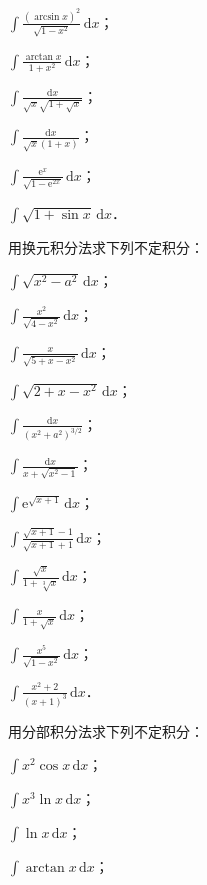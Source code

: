 \begin{xiti}
\begin{ziti}
\item $\displaystyle\int\frac{(\arcsin x)^{2}}{\sqrt{1-x^{2}}}\,\mathrm{d}x$；
\item $\displaystyle\int\frac{\arctan x}{1+x^{2}}\,\mathrm{d}x$；
\item $\displaystyle\int\frac{\mathrm{d}x}{\sqrt{x}\sqrt{1+\sqrt{x}}}$；
\item $\displaystyle\int\frac{\mathrm{d}x}{\sqrt{x}(1+x)}$；
\item $\displaystyle\int\frac{\mathrm{e}^{x}}{\sqrt{1-\mathrm{e}^{2x}}}\,\mathrm{d}x$；
\item $\displaystyle\int\sqrt{1+\sin x}\,\mathrm{d}x$．
\end{ziti}
\item 用换元积分法求下列不定积分：
\begin{ziti}
\item $\displaystyle\int\sqrt{x^{2}-a^{2}}\,\mathrm{d}x$；
\item $\displaystyle\int\frac{x^{2}}{\sqrt{4-x^{2}}}\,\mathrm{d}x$；
\item $\displaystyle\int\frac{x}{\sqrt{5+x-x^{2}}}\,\mathrm{d}x$；
\item $\displaystyle\int\sqrt{2+x-x^{2}}\,\mathrm{d}x$；
\item $\displaystyle\int\frac{\mathrm{d}x}{\left(x^{2}+a^{2}\right)^{3/2}}$；
\item $\displaystyle\int\frac{\mathrm{d}x}{x+\sqrt{x^{2}-1}}$；
\item $\displaystyle\int\mathrm{e}^{\sqrt{x+1}}\,\mathrm{d}x$；
\item $\displaystyle\int\frac{\sqrt{x+1}-1}{\sqrt{x+1}+1}\,\mathrm{d}x$；
\item $\displaystyle\int\frac{\sqrt{x}}{1+\sqrt[3]{x}}\,\mathrm{d}x$；
\item $\displaystyle\int\frac{x}{1+\sqrt{x}}\,\mathrm{d}x$；
\item $\displaystyle\int\frac{x^{5}}{\sqrt{1-x^{2}}}\,\mathrm{d}x$；
\item $\displaystyle\int\frac{x^{2}+2}{(x+1)^{3}}\,\mathrm{d}x$．
\end{ziti}
\item 用分部积分法求下列不定积分：
\begin{ziti}
\item $\displaystyle\int x^{2}\cos x\,\mathrm{d}x$；
\item $\displaystyle\int x^{3}\ln x\,\mathrm{d}x$；
\item $\displaystyle\int\ln x\,\mathrm{d}x$；
\item $\displaystyle\int\arctan x\,\mathrm{d}x$；

\end{ziti}
\end{xiti}
